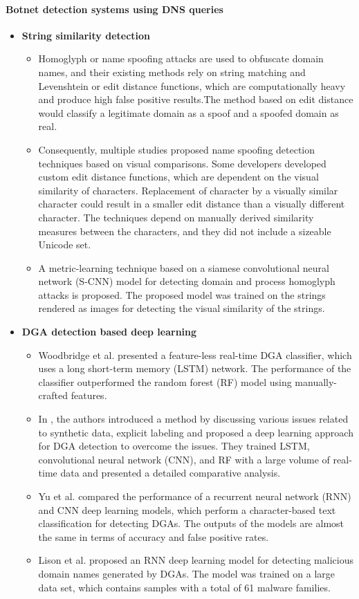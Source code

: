 \documentclass[conference]{IEEEtran}
\begin{document}
\paragraph{\textbf{Botnet detection
systems using DNS queries}}
\begin{itemize}
\item{\textbf{String similarity detection\cite{b13}}}
\begin{itemize}
\item{Homoglyph or name spoofing attacks are used to obfuscate domain names, and their existing methods rely on string matching and Levenshtein or edit distance functions, which are computationally heavy and produce high false positive results.The method based on edit distance would classify a legitimate domain as a spoof and a spoofed domain as real.}


\item{Consequently, multiple studies proposed name spoofing detection techniques based on visual comparisons. Some developers developed custom edit distance functions, which are dependent on the visual similarity of characters. Replacement of character by a visually similar character could result in a smaller edit distance than a visually different character. The techniques depend on manually derived similarity measures between the characters, and they did not include a sizeable Unicode set. 
}
\item{
A metric-learning technique based on a siamese convolutional neural network (S-CNN) model for detecting domain and process homoglyph attacks is proposed. The proposed model was trained on the strings rendered as images for detecting the visual similarity of the strings. }
\end{itemize}


\item{\textbf{DGA detection based deep
learning\cite{b13}}}
\begin{itemize}
\item{Woodbridge
et al. presented a feature-less real-time DGA classifier,
which uses a long short-term memory (LSTM) network. The
performance of the classifier outperformed the random forest
(RF) model using manually-crafted features.}
\item{ In \cite{b13}, the
authors introduced a method by discussing various issues related to synthetic data,
explicit labeling and proposed a deep learning approach for
DGA detection to overcome the issues. They trained LSTM,
convolutional neural network (CNN), and RF with a large
volume of real-time data and presented a detailed comparative
analysis. }
\item{Yu et al. compared the performance of
a recurrent neural network (RNN) and CNN deep learning
models, which perform a character-based text classification
for detecting DGAs. The outputs of the models are almost the
same in terms of accuracy and false positive rates.}
\item{Lison et al. proposed an RNN deep learning model
for detecting malicious domain names generated by DGAs.
The model was trained on a large data set, which contains
samples with a total of 61 malware families.}
\end{itemize}


\end{itemize}
\end{document}
